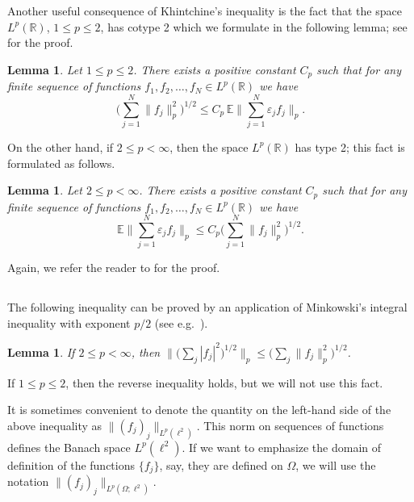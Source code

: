 \documentclass[reqno,a4paper,12pt]{amsart}
\numberwithin{equation}{section}
\numberwithin{figure}{section}
\newcommand\R{\mathbb{R}}
\newcommand\1{\mathds{1}}
\newcommand\eps{\varepsilon}
\newcommand{\E}{\mathbb{E}}
\renewcommand\le{\leqslant}
\renewcommand\leq{\leqslant}
\theoremstyle{plain}
\newtheorem{lem}[thm]{Lemma}
\newtheorem{lemma}[thm]{Lemma}
\theoremstyle{definition}
\begin{document}
Another useful consequence of Khintchine's inequality is the fact that the space $L^p(\R)$, $1\le p\le 2$, has cotype 2 which we formulate in the following lemma; see \cite[Theorem 6.2.14]{AK16} for the proof.

\begin{lemma}
\label{lem:cotype}
Let $1\le p \le 2$. There exists a positive constant $C_p$ such that for any finite 
sequence of functions $f_1, f_2, \ldots, f_N \in L^p(\R)$ we have 
\begin{equation}
\label{eq:cotype}
\Big( \sum_{j=1}^N \|f_j\|_p^2 \Big)^{1/2}\leq C_p \, \E \Big\|\sum_{j=1}^N \eps_j f_j\Big\|_p.
\end{equation}
\end{lemma}

On the other hand, if $2\le p < \infty$, then the space
$L^p(\R)$ has type 2; this fact is formulated as follows.

\begin{lemma}
\label{lem:type}
Let $2\le p < \infty$. There exists a positive constant $C_p$ such that for any finite 
sequence of functions $f_1, f_2, \ldots, f_N \in L^p(\R)$ we have 
\begin{equation}
\label{eq:type}
\E \Big\|\sum_{j=1}^N \eps_j f_j\Big\|_p\le C_p\Big( \sum_{j=1}^N \|f_j\|_p^2 \Big)^{1/2}.
\end{equation}
\end{lemma}
Again, we refer the reader to \cite[Theorem 6.2.14]{AK16} for the proof.

\subsection{}

The following inequality can be proved by an application of Minkowski's integral inequality with exponent $p/2$ (see e.g.\ \cite[p.\ 156]{AK16}).

\begin{lem}\label{lem:mink}
If $2\le p < \infty$, then $\Big\| \Big( \sum_j |f_j|^2\Big)^{1/2} \Big\|_p\le \Big( \sum_j \|f_j\|_p^2 \Big)^{1/2}$.
\end{lem}

If $1 \le p \le 2$, then the reverse inequality holds, but we will not use this fact.

It is sometimes convenient to denote the quantity on the left-hand side of the above inequality as $\|(f_j)_j\|_{L^p(\ell^2)}$. This norm on sequences of functions defines the Banach space $L^p(\ell^2)$. If we want to emphasize the domain of definition of the functions $\{f_j\}$, say, they are defined on $\Omega$, we will use the notation $\|(f_j)_j\|_{L^p(\Omega;  \ell^2)}$.
\end{document}
